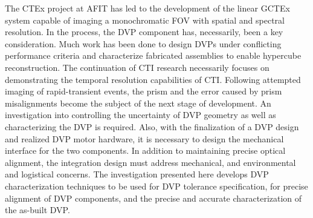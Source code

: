 The \ac{CTEx} project at \ac{AFIT} has led to the development of the linear \ac{GCTEx} system capable of imaging a monochromatic \ac{FOV} with spatial and spectral resolution. In the process, the \ac{DVP} component has, necessarily, been a key consideration. Much work has been done to design \acp{DVP} under conflicting performance criteria and characterize fabricated assemblies to enable hypercube reconstruction. The continuation of \ac{CTI} research necessarily focuses on demonstrating the temporal resolution capabilities of \ac{CTI}. Following attempted imaging of rapid-transient events, the prism and the error caused by prism misalignments become the subject of the next stage of development. An investigation into controlling the uncertainty of \ac{DVP} geometry as well as characterizing the \ac{DVP} is required. Also, with the finalization of a \ac{DVP} design and realized \ac{DVP} motor hardware, it is necessary to design the mechanical interface for the two components. In addition to maintaining precise optical alignment, the integration design must address mechanical, and environmental and logistical concerns. The investigation presented here develops \ac{DVP} characterization techniques to be used for \ac{DVP} tolerance specification, for precise alignment of \ac{DVP} components, and the precise and accurate characterization of the as-built \ac{DVP}.


